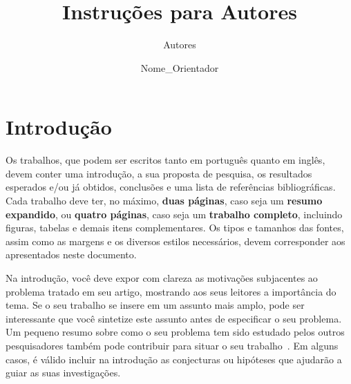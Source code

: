 \documentclass[11pt]{article}
\title{Instruções para Autores}
\author{Autores \and Nome\_Orientador}
\begin{document}
\hyphenation{}
\pagestyle{fancy}


  \section{Introdu\c{c}\~{a}o}
  \label{sec:introducao}

   Os trabalhos, que podem ser escritos tanto em portugu\^{e}s quanto em
   ingl\^{e}s, devem conter uma introdu\c{c}\~{a}o, a sua proposta de
   pesquisa, os resultados esperados e/ou j\'{a} obtidos, conclus\~{o}es e uma
   lista de refer\^{e}ncias bibliogr\'{a}ficas. Cada trabalho deve ter, no
   m\'{a}ximo, \textbf{duas p\'{a}ginas}, caso seja um \textbf{resumo expandido}, ou \textbf{quatro p\'{a}ginas}, caso seja um \textbf{trabalho completo}, incluindo figuras, tabelas e demais itens
   complementares. Os tipos e tamanhos das fontes, assim como as
   margens e os diversos estilos necess\'{a}rios, devem corresponder aos
   apresentados neste documento.

   Na introdu\c{c}\~{a}o, voc\^{e} deve expor com clareza as motiva\c{c}\~{o}es
   subjacentes ao problema tratado em seu artigo, mostrando aos seus
   leitores a import\^{a}ncia do tema. Se o seu trabalho se insere em um
   assunto mais amplo, pode ser interessante que voc\^{e} sintetize este
   assunto antes de especificar o seu problema. Um pequeno resumo
   sobre como o seu problema tem sido estudado pelos outros
   pesquisadores tamb\'{e}m pode contribuir para situar o seu
   trabalho~\cite{Blinn87}. Em alguns casos, \'{e} v\'{a}lido incluir na
   introdu\c{c}\~{a}o as conjecturas ou hip\'{o}teses que ajudar\~{a}o a guiar as
   suas investiga\c{c}\~{o}es.
\end{document}

